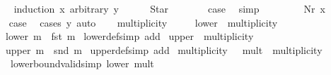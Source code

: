 \begin{isabellebody}
\ \ \isamarkupfalse%
\ {\isacharparenleft}induction\ x\ arbitrary{\isacharcolon}\ y{\isacharparenright}\isanewline
\ \ \ \ \isamarkupfalse%
\ Star\isanewline
\ \ \ \ \isamarkupfalse%
\ \isamarkupfalse%
\ {\isacharquery}case\ \isamarkupfalse%
\ simp\isanewline
\ \ \isamarkupfalse%
\isanewline
\ \ \ \ \isamarkupfalse%
\ {\isacharparenleft}Nr\ x{\isacharparenright}\isanewline
\ \ \ \ \isamarkupfalse%
\ \isamarkupfalse%
\ {\isacharquery}case\ \isamarkupfalse%
\ {\isacharparenleft}cases\ y{\isacharparenright}\ auto\isanewline
\ \ \isamarkupfalse%
\isanewline
{}\isamarkupfalse%
%
\endisatagproof
{\isafoldproof}%
%
\isadelimproof
%
\endisadelimproof
\isanewline
\isanewline
{}\isamarkupfalse%
%
\isadelimdocument
%
\endisadelimdocument
%
\isatagdocument
%
\isamarkuptrue%
%
\endisatagdocument
{\isafolddocument}%
%
\isadelimdocument
%
\endisadelimdocument
{}\isamarkupfalse%
\ multiplicity\ {\isacharequal}\ {\isachardoublequoteopen}{\isasymM}\ {\isasymtimes}\ {\isasymM}{\isachardoublequoteclose}\isanewline
\isanewline
{}\isamarkupfalse%
\ lower\ {\isacharcolon}{\isacharcolon}\ {\isachardoublequoteopen}multiplicity\ {\isasymRightarrow}\ {\isasymM}{\isachardoublequoteclose}\ \isanewline
\ \ {\isachardoublequoteopen}lower\ m\ {\isasymequiv}\ fst\ m{\isachardoublequoteclose}\isanewline
\isanewline
{}\isamarkupfalse%
\ lower{\isacharunderscore}def{\isacharbrackleft}simp\ add{\isacharbrackright}\isanewline
\isanewline
{}\isamarkupfalse%
\ upper\ {\isacharcolon}{\isacharcolon}\ {\isachardoublequoteopen}multiplicity\ {\isasymRightarrow}\ {\isasymM}{\isachardoublequoteclose}\ \isanewline
\ \ {\isachardoublequoteopen}upper\ m\ {\isasymequiv}\ snd\ m{\isachardoublequoteclose}\isanewline
\isanewline
{}\isamarkupfalse%
\ upper{\isacharunderscore}def{\isacharbrackleft}simp\ add{\isacharbrackright}\isanewline
\isanewline
{}\isamarkupfalse%
\ multiplicity\ {\isacharequal}\ \ mult\ {\isacharcolon}{\isacharcolon}\ {\isachardoublequoteopen}multiplicity{\isachardoublequoteclose}\isanewline
\ \ \ lower{\isacharunderscore}bound{\isacharunderscore}valid{\isacharbrackleft}simp{\isacharbrackright}{\isacharcolon}\ {\isachardoublequoteopen}lower\ mult\ {\isasymnoteq}\ \isactrlemph {\isachardoublequoteclose}\isanewline

\end{isabellebody}
